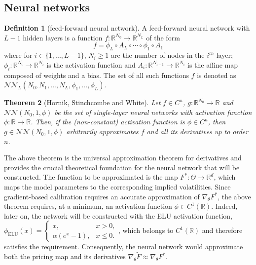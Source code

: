 \documentclass[12pt,a4paper]{article}
\newtheorem{theorem}{Theorem}[section] \newtheorem{proposition}[theorem]{Proposition} \newtheorem{lemma}[theorem]{Lemma} \newtheorem{corollary}[theorem]{Corollary} \theoremstyle{definition} \newtheorem{definition}[theorem]{Definition}
\theoremstyle{remark} \newtheorem{remark}[theorem]{Remark}
\begin{document}
\subsection{Neural networks}\label{neural networks section}
\begin{definition}[feed-forward neural network]
    A feed-forward neural network with $L-1$ hidden layers is a function $f:\mathbb R^{N_0}\to \mathbb R^{N_L}$ of the form
    \[
    f=\phi _L\circ A_L\circ\cdots\circ\phi _1\circ A_1
    \]
    where for $i\in \{1, ..., L-1\}$, $N_i\geq 1$ are the number of nodes in the $i^{th}$ layer; $\phi_i:\mathbb R^{N_i}\to \mathbb R^{N_i}$ is the activation function and $A_i:\mathbb R^{N_{i-1}}\to \mathbb R^{N_i}$ is the affine map composed of weights and a bias. The set of all such functions $f$ is denoted as $\mathcal N\mathcal N_{L}(N_0, N_1, ..., N_L, \phi_1, ..., \phi_L)$.
\end{definition}
\begin{theorem}[Hornik, Stinchcombe and White]
    Let $f\in C^n$, $g : \mathbb R^{N_0} \to \mathbb R$ and $\mathcal N\mathcal N(N_0, 1, \phi )$ be the set of single-layer neural networks with
activation function $\phi:\mathbb R\to \mathbb R$. Then, if the
(non-constant) activation function is $\phi\in C^{n}$, then $g\in \mathcal N\mathcal N(N_0, 1, \phi)$ arbitrarily approximates $f$ and all
its derivatives up to order $n$.
\end{theorem}
\noindent The above theorem is the universal approximation theorem for derivatives 
and provides the crucial theoretical foundation for the neural network that will be
constructed. The function to be approximated is the map $
F^* \colon \Theta \to\mathbb{R}^{d}$,
which maps the model parameters to the corresponding implied volatilities. 
Since gradient-based calibration requires an accurate approximation of
\(\nabla_{\theta} F^*\), the above theorem requires, at a minimum, an activation 
function \(\phi \in C^1(\mathbb{R})\).
Indeed, later on, the network will be constructed with the ELU activation function,
$\displaystyle \phi_{\mathrm{ELU}}(x)
=
\begin{cases}
x, & x > 0,\\
\alpha\left(e^x - 1\right), & x \leq 0.
\end{cases}$, which belongs to \(C^1(\mathbb{R})\) and 
therefore satisfies the requirement. Consequently, the neural network would 
approximate both the pricing map and its derivatives $
\nabla_{\theta}\widetilde{F}
\approx
\nabla_{\theta}F^*$.
\end{document}
